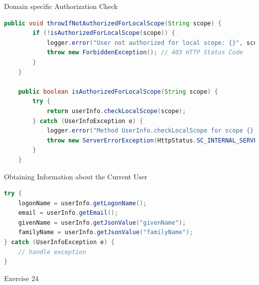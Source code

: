 \begin{frame}[fragile,t]{Domain specific Authorization Check}
\vspace{-3mm}
\begin{lstlisting}[language=java]
    public void throwIfNotAuthorizedForLocalScope(String scope) {
        if (!isAuthorizedForLocalScope(scope)) {
            logger.error("User not authorized for local scope: {}", scope);
            throw new ForbiddenException(); // 403 HTTP Status Code
        }
    }

    public boolean isAuthorizedForLocalScope(String scope) {
        try {
            return userInfo.checkLocalScope(scope);
        } catch (UserInfoException e) {
            logger.error("Method UserInfo.checkLocalScope for scope {} failed", scope, e);
            throw new ServerErrorException(HttpStatus.SC_INTERNAL_SERVER_ERROR, e);
        }
    }
\end{lstlisting}
\vspace{-5mm}
\end{frame}


\begin{frame}[fragile,t]{Obtaining Information about the Current User}
\begin{lstlisting}[language=java]
try {
    logonName = userInfo.getLogonName();
    email = userInfo.getEmail();
    givenName = userInfo.getJsonValue("givenName");
    familyName = userInfo.getJsonValue("familyName");
} catch (UserInfoException e) {
    // handle exception
}
\end{lstlisting}
\end{frame}


\begin{frame}{Exercise 24}
    \begin{figure}
    \end{figure}
\end{frame}


